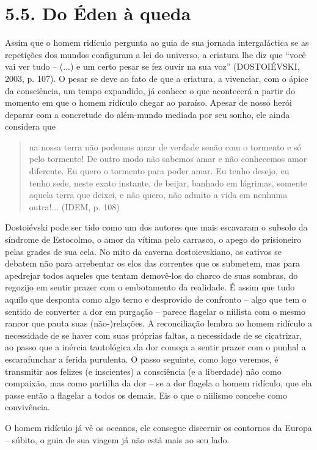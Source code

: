 \section{5.5. Do Éden à queda}

Assim que o homem ridículo pergunta ao guia de sua jornada
intergaláctica se as repetições dos mundos configuram a lei do universo,
a criatura lhe diz que ``você vai ver tudo -- (...) e um certo pesar se
fez ouvir na sua voz'' (DOSTOIÉVSKI, 2003, p. 107). O pesar se deve ao
fato de que a criatura, a vivenciar, com o ápice da consciência, um
tempo expandido, já conhece o que acontecerá a partir do momento em que
o homem ridículo chegar ao paraíso. Apesar de nosso herói deparar com a
concretude do além-mundo mediada por seu sonho, ele ainda considera que

\begin{quote}
na nossa terra não podemos amar de verdade senão com o tormento e só
pelo tormento! De outro modo não sabemos amar e não conhecemos amor
diferente. Eu quero o tormento para poder amar. Eu tenho desejo, eu
tenho sede, neste exato instante, de beijar, banhado em lágrimas,
somente aquela terra que deixei, e não quero, não admito a vida em
nenhuma outra!... (IDEM, p. 108)
\end{quote}

Dostoiévski pode ser tido como um dos autores que mais escavaram o
subsolo da síndrome de Estocolmo, o amor da vítima pelo carrasco, o
apego do prisioneiro pelas grades de sua cela. No mito da caverna
dostoievskiano, os cativos se debatem não para arrebentar os elos das
correntes que os submetem, mas para apedrejar todos aqueles que tentam
demovê-los do charco de suas sombras, do regozijo em sentir prazer com o
embotamento da realidade. É assim que tudo aquilo que desponta como algo
terno e desprovido de confronto -- algo que tem o sentido de converter a
dor em purgação -- parece flagelar o niilista com o mesmo rancor que
pauta suas (não-)relações. A reconciliação lembra ao homem ridículo a
necessidade de se haver com suas próprias faltas, a necessidade de se
cicatrizar, ao passo que a inércia tautológica da dor começa a sentir
prazer com o punhal a escarafunchar a ferida purulenta. O passo
seguinte, como logo veremos, é transmitir aos felizes (e inscientes) a
consciência (e a liberdade) não como compaixão, mas como partilha da dor
-- se a dor flagela o homem ridículo, que ela passe então a flagelar a
todos os demais. Eis o que o niilismo concebe como convivência.

O homem ridículo já vê os oceanos, ele consegue discernir os contornos
da Europa -- súbito, o guia de sua viagem já não está mais ao seu lado.

